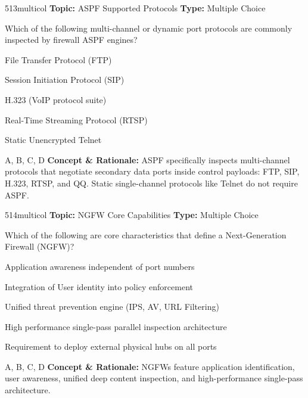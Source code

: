 \begin{qcard}{513}{multicol}
\textcolor{darkslate!75}{\small\textbf{Topic:} ASPF Supported Protocols \hfill \textbf{Type:} Multiple Choice}\vspace{0.4em}\par
Which of the following multi-channel or dynamic port protocols are commonly inspected by firewall ASPF engines?
\begin{qoptions}
\item File Transfer Protocol (FTP)
\item Session Initiation Protocol (SIP)
\item H.323 (VoIP protocol suite)
\item Real-Time Streaming Protocol (RTSP)
\item Static Unencrypted Telnet
\end{qoptions}
\end{qcard}
\nopagebreak
\begin{explainbox}{A, B, C, D}
\textbf{Concept \& Rationale:} ASPF specifically inspects multi-channel protocols that negotiate secondary data ports inside control payloads: FTP, SIP, H.323, RTSP, and QQ. Static single-channel protocols like Telnet do not require ASPF.
\end{explainbox}

\begin{qcard}{514}{multicol}
\textcolor{darkslate!75}{\small\textbf{Topic:} NGFW Core Capabilities \hfill \textbf{Type:} Multiple Choice}\vspace{0.4em}\par
Which of the following are core characteristics that define a Next-Generation Firewall (NGFW)?
\begin{qoptions}
\item Application awareness independent of port numbers
\item Integration of User identity into policy enforcement
\item Unified threat prevention engine (IPS, AV, URL Filtering)
\item High performance single-pass parallel inspection architecture
\item Requirement to deploy external physical hubs on all ports
\end{qoptions}
\end{qcard}
\nopagebreak
\begin{explainbox}{A, B, C, D}
\textbf{Concept \& Rationale:} NGFWs feature application identification, user awareness, unified deep content inspection, and high-performance single-pass architecture.
\end{explainbox}

